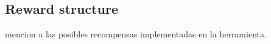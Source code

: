 



\subsection{Reward structure}
mencion a las posibles recompensas implementadas en la herramienta.

